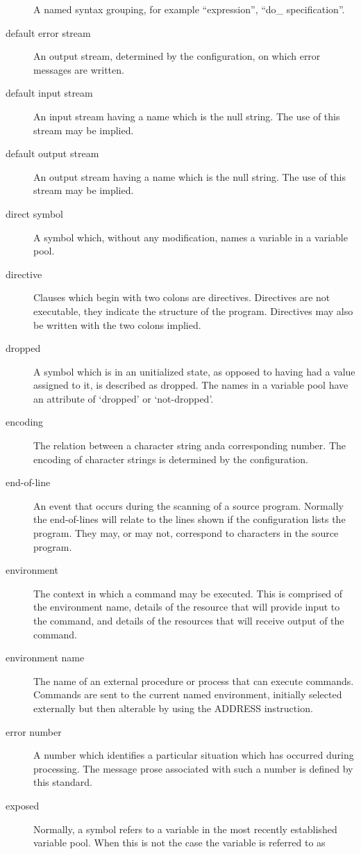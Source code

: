 \begin{description}
A named syntax grouping, for example ``expression'', ``do\_
specification''.
\item[default error stream]
An output stream, determined by the configuration, on which error
messages are written.
\item[default input stream]
An input stream having a name which is the null string. The use of this
stream may be implied.
\item[default output stream]
An output stream having a name which is the null string. The use of this
stream may be implied.
\item[direct symbol]
A symbol which, without any modification, names a variable in a variable
pool.
\item[directive]
Clauses which begin with two colons are directives. Directives are not
executable, they indicate the structure of the program. Directives may
also be written with the two colons implied.
\item[dropped]
A symbol which is in an unitialized state, as opposed to having had a
value assigned to it, is described as dropped. The names in a variable
pool have an attribute of `dropped' or `not-dropped'.
\item[encoding]
The relation between a character string anda corresponding number. The
encoding of character strings is determined by the configuration.
\item[end-of-line]
An event that occurs during the scanning of a source program. Normally
the end-of-lines will relate to the lines shown if the configuration
lists the program. They may, or may not, correspond to characters in the
source program.
\item[environment]
The context in which a command may be executed. This is comprised of the
environment name, details of the resource that will provide input to the
command, and details of the resources that will receive output of the
command.
\item[environment name]
The name of an external procedure or process that can execute commands.
Commands are sent to the current named environment, initially selected
externally but then alterable by using the ADDRESS instruction.
\item[error number]
A number which identifies a particular situation which has occurred
during processing. The message prose associated with such a number is
defined by this standard.
\item[exposed]
Normally, a symbol refers to a variable in the most recently established
variable pool. When this is not the case the variable is referred to as

\end{description}
